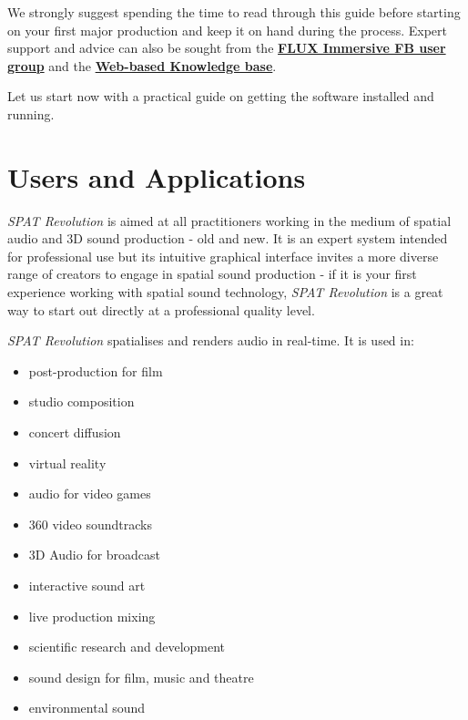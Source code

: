 \documentclass[
  letterpaper,
  DIV=11,
  numbers=noendperiod]{scrreport}
\providecommand{\tightlist}{%
  \setlength{\itemsep}{0pt}\setlength{\parskip}{0pt}}\usepackage{longtable,booktabs,array}
\begin{document}
We strongly suggest spending the time to read through this guide before
starting on your first major production and keep it on hand during the
process. Expert support and advice can also be sought from the
\textbf{\href{https://www.facebook.com/groups/fluximmersive.usergroup/}{FLUX
Immersive FB user group}} and the
\textbf{\href{https://www.flux.audio/knowledge-base/category/spat-revolution/}{Web-based
Knowledge base}}.

Let us start now with a practical guide on getting the software
installed and running.


\hypertarget{users-and-applications}{%
\chapter{Users and Applications}\label{users-and-applications}}

\emph{SPAT Revolution} is aimed at all practitioners working in the
medium of spatial audio and 3D sound production - old and new. It is an
expert system intended for professional use but its intuitive graphical
interface invites a more diverse range of creators to engage in spatial
sound production - if it is your first experience working with spatial
sound technology, \emph{SPAT Revolution} is a great way to start out
directly at a professional quality level.

\emph{SPAT Revolution} spatialises and renders audio in real-time. It is
used in:

\begin{itemize}
\tightlist
\item
  post-production for film
\item
  studio composition
\item
  concert diffusion
\item
  virtual reality
\item
  audio for video games
\item
  360 video soundtracks
\item
  3D Audio for broadcast
\item
  interactive sound art
\item
  live production mixing
\item
  scientific research and development
\item
  sound design for film, music and theatre
\item
  environmental sound
\end{itemize}
\end{document}
